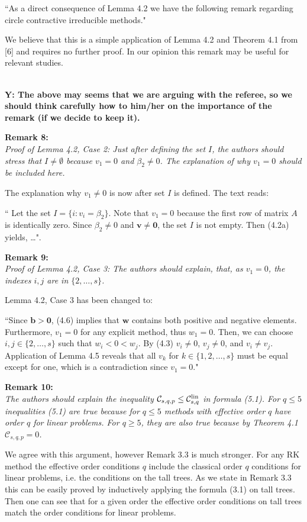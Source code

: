 \documentclass[12pt]{article}
\newcommand{\remark}[2]{\vspace{25pt} \noindent \textbf{Remark #1:\newline} \textit{#2}\vspace{15pt}}
\renewcommand{\newline}{\vspace{15pt}\\}
\newcommand{\sspcoef}{\mathcal{C}}
\newcommand{\clin}{\sspcoef^{\textnormal{lin}}_{s,q}}
\newcommand{\yiannis}[1]{\textcolor{OliveGreen}{\\\textbf{Y: \footnotesize #1}\\}}
\begin{document}
``As a direct consequence of Lemma 4.2 we have the following 
remark regarding circle contractive irreducible methods."

We believe that this is a simple application of Lemma 4.2 and Theorem 4.1
from [6] and requires no further proof. In our opinion this remark may be useful for
relevant studies.

\yiannis{The above may seems that we are arguing with the referee, so we should think 
carefully how to  him/her on the importance of the remark (if we decide to keep it). }

\remark{8}{
Proof of Lemma 4.2, Case 2: Just after defining the set $I$, the authors should stress that
$I \neq \emptyset$ because $v_1 = 0$ and $\beta_2 \neq 0$.
The explanation of why $v_1 = 0$ should be included
here.}

The explanation why $v_1 \neq 0$ is now after set $I$ is defined. The text reads:

``	Let the set $I = \{i : v_i = \beta_2\}$. 
Note that $v_1 = 0$ because the first row of matrix $A$ is identically zero.
Since $\beta_2 \neq 0$ and $ \bm{v} \neq \bm{0}$, the set $I$ is not empty.
Then (4.2a) yields, \dots".
	
\remark{9}{
Proof of Lemma 4.2, Case 3: The authors should explain, that, as $v_1 = 0$, the 
indexes $i,j$ are in $\{2,\dots,s\}$.}

Lemma 4.2, Case 3 has been changed to:

``Since $\bm{b} > \bm{0}$, (4.6) implies that $\bm{w}$ contains both positive 
and negative elements. 
Furthermore, $v_1=0$ for any explicit method, thus $w_1=0$.
Then, we can choose $i, j \in \{2, \dots, s\}$ such that $w_i < 0 < w_j$.
By (4.3) $v_i\ne 0$, $v_j\ne 0$, and $v_i\ne v_j$.
Application of Lemma 4.5 reveals that all $v_k$ for 
$k \in\{1,2,\dots,s\}$ must be equal except for one, which is a contradiction
since $v_1 = 0$."

\remark{10}{
The authors should explain the inequality $\sspcoef_{s,q,p} \leq \clin$ in formula (5.1). 
For $q \leq 5$ inequalities (5.1) are true because for $q \leq 5$ methods with effective 
order $q$ have order $q$ for linear problems. 
For $q \geq 5$, they are also true because by Theorem 4.1 $\sspcoef_{s,q,p}  = 0$.}

We agree with this argument, however Remark 3.3 is much stronger. 
For any RK method the effective order conditions $q$ include the classical order $q$ 
conditions for linear problems, i.e. the conditions on the tall trees. 
As we state in Remark 3.3 this can be easily proved by inductively applying the formula 
(3.1) on tall trees. 
Then one can see that for a given order the effective order conditions on tall trees 
match the order conditions for linear problems.
\end{document}
